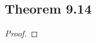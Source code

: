 \documentclass[../../main.tex]{subfiles}
\begin{document}
\subsection{Theorem 9.14}
\begin{wts}

\end{wts}
\begin{proof}

\end{proof}
\end{document}
